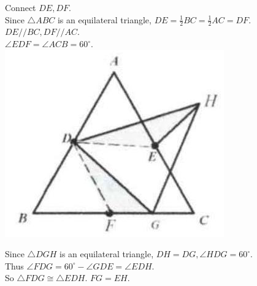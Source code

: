 \documentclass[10pt]{article}
\begin{document}
Connect \(D E, D F\).\\
Since \(\triangle A B C\) is an equilateral triangle, \(D E=\frac{1}{2} B C=\frac{1}{2} A C=D F\).\\
\(D E / / B C, D F / / A C\).\\
\(\angle E D F=\angle A C B=60^{\circ}\).\\
\includegraphics[max width=\textwidth, center]{2025_04_17_97bc1f7e44d93c271a88g-051(2)}

Since \(\triangle D G H\) is an equilateral triangle, \(D H=D G, \angle H D G=60^{\circ}\).\\
Thus \(\angle F D G=60^{\circ}-\angle G D E=\angle E D H\).\\
So \(\triangle F D G \cong \triangle E D H\). \(F G=E H\).
\end{document}
